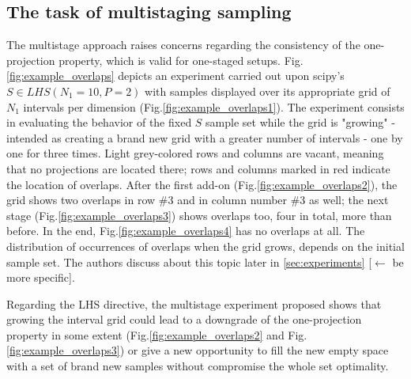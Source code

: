 \documentclass[12pt]{extarticle}
\newcommand{\mfigref}[1]{Fig.\ref{#1}}
\begin{document}
\subsection{The task of multistaging sampling}
\label{subsec:multistage_task}
The multistage approach raises concerns regarding the consistency of the one-projection property, which is valid for one-staged setups. \mfigref{fig:example_overlaps} depicts an experiment carried out upon scipy's $S \in LHS(N_1 = 10, P = 2)$ with samples displayed over its appropriate grid of $N_1$ intervals per dimension (\mfigref{fig:example_overlaps1}). The experiment consists in evaluating the behavior of the fixed $S$ sample set while the grid is "growing" - intended as creating a brand new grid with  a greater number of intervals - one by one for three times. 
Light grey-colored rows and columns are vacant, meaning that no projections are located there; rows and columns marked in red indicate the location of overlaps. After the first add-on (\mfigref{fig:example_overlaps2}), the grid shows two overlaps in row \#3 and in column number \#3 as well; the next stage (\mfigref{fig:example_overlaps3}) shows overlaps too, four in total, more than before. In the end, \mfigref{fig:example_overlaps4} has no overlaps at all. The distribution of occurrences of overlaps when the grid grows, depends on the initial sample set. The authors discuss about this topic later in \cref{sec:experiments} [$\longleftarrow$ be more specific].

Regarding the LHS directive, the multistage experiment proposed shows that growing the interval grid could lead to a downgrade of the one-projection property in some extent (\mfigref{fig:example_overlaps2} and \mfigref{fig:example_overlaps3}) or give a new opportunity to fill the new empty space with a set of brand new samples without compromise the whole set optimality. 
\end{document}
